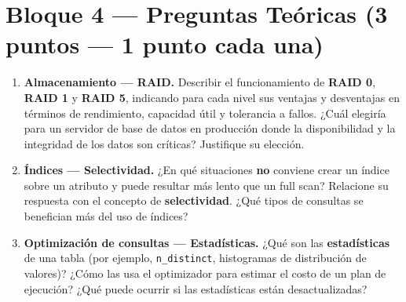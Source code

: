 \documentclass[11pt,a4paper]{article}
\begin{document}
\section*{Bloque 4 — Preguntas Teóricas \hfill\normalfont(3 puntos — 1 punto cada una)}

\begin{enumerate}

  \item \textbf{Almacenamiento — RAID.} Describir el funcionamiento de \textbf{RAID 0}, \textbf{RAID 1} y \textbf{RAID 5}, indicando para cada nivel sus ventajas y desventajas en términos de rendimiento, capacidad útil y tolerancia a fallos. ¿Cuál elegiría para un servidor de base de datos en producción donde la disponibilidad y la integridad de los datos son críticas? Justifique su elección.

  \vspace{6cm}

  \item \textbf{Índices — Selectividad.} ¿En qué situaciones \textbf{no} conviene crear un índice sobre un atributo y puede resultar más lento que un full scan? Relacione su respuesta con el concepto de \textbf{selectividad}. ¿Qué tipos de consultas se benefician más del uso de índices?

  \vspace{6cm}

  \item \textbf{Optimización de consultas — Estadísticas.} ¿Qué son las \textbf{estadísticas} de una tabla (por ejemplo, \texttt{n\_distinct}, histogramas de distribución de valores)? ¿Cómo las usa el optimizador para estimar el costo de un plan de ejecución? ¿Qué puede ocurrir si las estadísticas están desactualizadas?

  \vspace{6cm}

\end{enumerate}
\end{document}
